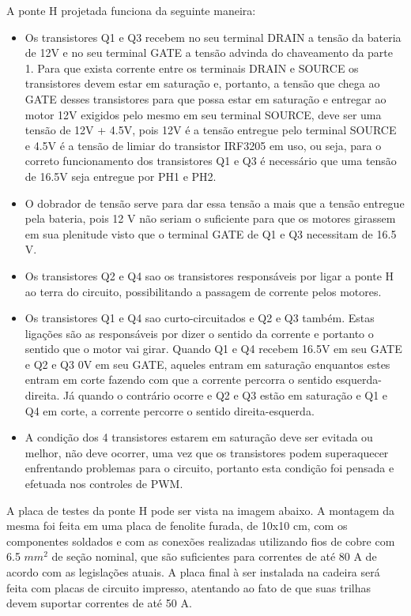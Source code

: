 A ponte H projetada funciona da seguinte maneira: 

\begin{itemize}
	\item Os transistores Q1 e Q3 recebem no seu terminal DRAIN a tensão da bateria de 12V e no seu terminal GATE a tensão advinda do chaveamento da parte 1. Para que exista corrente entre os terminais DRAIN e SOURCE os transistores devem estar em saturação e, portanto, a tensão que chega ao GATE desses transistores para que possa estar em saturação e entregar ao motor 12V exigidos pelo mesmo em seu terminal SOURCE, deve ser uma tensão de 12V + 4.5V, pois 12V é a tensão entregue pelo terminal SOURCE e 4.5V é a tensão de limiar do transistor IRF3205 em uso, ou seja, para o correto funcionamento dos transistores Q1 e Q3 é necessário que uma tensão de 16.5V seja entregue por PH1 e PH2.
    \item O dobrador de tensão serve para dar essa tensão a mais que a tensão entregue pela bateria, pois 12 V não seriam o suficiente para que os motores girassem em sua plenitude visto que o terminal GATE de Q1 e Q3 necessitam de 16.5 V.
    \item Os transistores Q2 e Q4 sao os transistores responsáveis por ligar a ponte H ao terra do circuito, possibilitando a passagem de corrente pelos motores. 
    \item Os transistores Q1 e Q4 sao curto-circuitados e Q2 e Q3 também. Estas ligações são as responsáveis por dizer o sentido da corrente e portanto o sentido que o motor vai girar. Quando Q1 e Q4 recebem 16.5V em seu GATE e Q2 e Q3 0V em seu GATE, aqueles entram em saturação enquantos estes entram em corte fazendo com que a corrente percorra o sentido esquerda-direita. Já quando o contrário ocorre e Q2 e Q3 estão em saturação e Q1 e Q4 em corte, a corrente percorre o sentido direita-esquerda. 
    \item A condição dos 4 transistores estarem em saturação deve ser evitada ou melhor, não deve ocorrer, uma vez que os transistores podem superaquecer enfrentando problemas para o circuito, portanto esta condição foi pensada e efetuada nos controles de PWM.

\end{itemize}

A placa de testes da ponte H pode ser vista na imagem abaixo. A montagem da
mesma foi feita em uma placa de fenolite furada, de 10x10 cm, com os
componentes soldados e com as conexões realizadas utilizando fios de cobre com
6.5 \(mm^2\) de seção nominal, que são suficientes para correntes de até 80 A
de acordo com as legislações atuais. A placa final à ser instalada na cadeira
será feita com placas de circuito impresso, atentando ao fato de que suas
trilhas devem suportar correntes de até 50 A.

